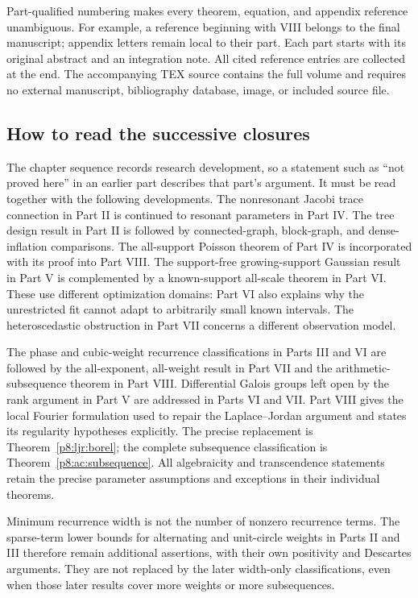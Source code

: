 \documentclass[11pt,a4paper]{article}
\theoremstyle{definition}
\theoremstyle{remark}
\numberwithin{equation}{section}
\begin{document}
Part-qualified numbering makes every theorem, equation, and appendix
reference unambiguous. For example, a reference beginning with VIII belongs
to the final manuscript; appendix letters remain local to their part.
Each part starts with its original abstract and an integration note.
All cited reference entries are collected at the end. The accompanying
TEX source contains the full volume and requires no external manuscript,
bibliography database, image, or included source file.

\subsection*{How to read the successive closures}

The chapter sequence records research development, so a statement such as
``not proved here'' in an earlier part describes that part's argument.
It must be read together with the following developments. The nonresonant
Jacobi trace connection in Part II is continued to resonant parameters in
Part IV. The tree design result in Part II is followed by connected-graph,
block-graph, and dense-inflation comparisons. The all-support Poisson
theorem of Part IV is incorporated with its proof into Part VIII.
The support-free growing-support Gaussian result in Part V is complemented
by a known-support all-scale theorem in Part VI. These use different
optimization domains: Part VI also explains why the unrestricted fit
cannot adapt to arbitrarily small known intervals. The heteroscedastic
obstruction in Part VII concerns a different observation model.

The phase and cubic-weight recurrence classifications in Parts III and VI
are followed by the all-exponent, all-weight result in Part VII and the
arithmetic-subsequence theorem in Part VIII. Differential Galois groups
left open by the rank argument in Part V are addressed in Parts VI and VII.
Part VIII gives the local Fourier formulation used to repair the
Laplace--Jordan argument and states its regularity hypotheses explicitly.
The precise replacement is Theorem~\ref{p8:ljr:borel}; the complete
subsequence classification is Theorem~\ref{p8:ac:subsequence}.
All algebraicity and transcendence statements retain the precise
parameter assumptions and exceptions in their individual theorems.

Minimum recurrence width is not the number of nonzero recurrence terms.
The sparse-term lower bounds for alternating and unit-circle weights in
Parts II and III therefore remain additional assertions, with their own
positivity and Descartes arguments. They are not replaced by the later
width-only classifications, even when those later results cover more
weights or more subsequences.
\end{document}
